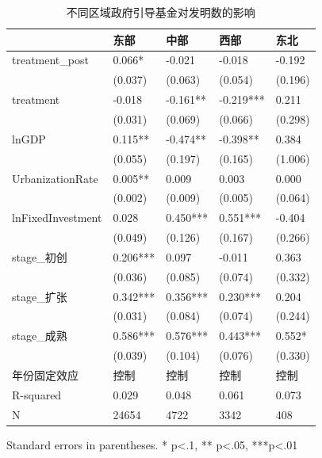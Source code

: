 \begin{table}
\caption{不同区域政府引导基金对发明数的影响}
\label{}
\begin{center}
\begin{tabular}{lllll}
\hline
                  & 东部       & 中部       & 西部        & 东北       \\
\hline
treatment\_post   & 0.066*   & -0.021   & -0.018    & -0.192   \\
                  & (0.037)  & (0.063)  & (0.054)   & (0.196)  \\
treatment         & -0.018   & -0.161** & -0.219*** & 0.211    \\
                  & (0.031)  & (0.069)  & (0.066)   & (0.298)  \\
lnGDP             & 0.115**  & -0.474** & -0.398**  & 0.384    \\
                  & (0.055)  & (0.197)  & (0.165)   & (1.006)  \\
UrbanizationRate              & 0.005**  & 0.009    & 0.003     & 0.000    \\
                  & (0.002)  & (0.009)  & (0.005)   & (0.064)  \\
lnFixedInvestment & 0.028    & 0.450*** & 0.551***  & -0.404   \\
                  & (0.049)  & (0.126)  & (0.167)   & (0.266)  \\
stage\_初创         & 0.206*** & 0.097    & -0.011    & 0.363    \\
                  & (0.036)  & (0.085)  & (0.074)   & (0.332)  \\
stage\_扩张         & 0.342*** & 0.356*** & 0.230***  & 0.204    \\
                  & (0.031)  & (0.084)  & (0.074)   & (0.244)  \\
stage\_成熟         & 0.586*** & 0.576*** & 0.443***  & 0.552*   \\
                  & (0.039)  & (0.104)  & (0.076)   & (0.330)  \\
年份固定效应  & 控制 & 控制 & 控制 & 控制\\ 
\hline

R-squared         & 0.029    & 0.048    & 0.061     & 0.073    \\
N                 & 24654    & 4722     & 3342      & 408      \\
\hline
\end{tabular}
\end{center}
\end{table}
\bigskip
Standard errors in parentheses. \newline 
* p<.1, ** p<.05, ***p<.01

